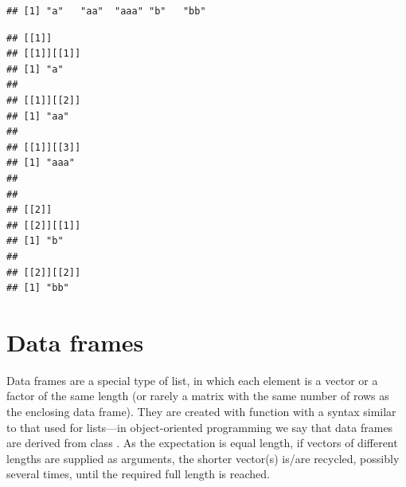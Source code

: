 \documentclass[krantz2]{krantz}\usepackage{knitr}
\begin{document}
\begin{knitrout}\footnotesize
{}\color{fgcolor}\begin{kframe}
\begin{alltt}
\end{alltt}
\begin{verbatim}
## [1] "a"   "aa"  "aaa" "b"   "bb"
\end{verbatim}
\begin{alltt}
\end{alltt}
\begin{verbatim}
## [[1]]
## [[1]][[1]]
## [1] "a"
## 
## [[1]][[2]]
## [1] "aa"
## 
## [[1]][[3]]
## [1] "aaa"
## 
## 
## [[2]]
## [[2]][[1]]
## [1] "b"
## 
## [[2]][[2]]
## [1] "bb"
\end{verbatim}
\end{kframe}
\end{knitrout}



\section{Data frames}\label{sec:R:data:frames}
Data frames are a special type of list, in which each element is a vector or a factor of the same length (or rarely a matrix with the same number of rows as the enclosing data frame). They are created with function  with a syntax similar to that used for lists---in object-oriented programming we say that data frames are derived from class . As the expectation is equal length, if vectors of different lengths are supplied as arguments, the shorter vector(s) is/are recycled, possibly several times, until the required full length is reached.
\end{document}
